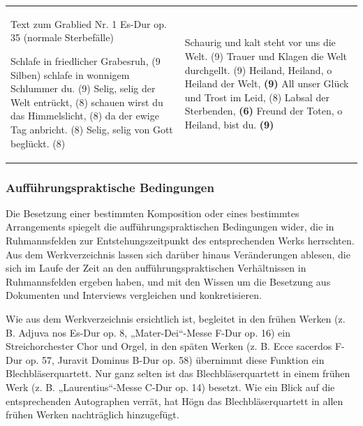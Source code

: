 \documentclass[a4paper]{article}
\begin{document}
\begin{flushleft}
\tablefirsthead{}
\tablehead{}
\tabletail{}
\tablelasttail{}
\begin{supertabular}{m{7.9230003cm}m{7.9230003cm}}
Text zum Grablied Nr. 1 Es-Dur op. 35 (normale Sterbefälle)

Schlafe in friedlicher Grabesruh, (9 Silben)\newline
schlafe in wonnigem Schlummer du. (9)\newline
Selig, selig der Welt entrückt, (8)\newline
schauen wirst du das Himmelslicht, (8)\newline
da der ewige Tag anbricht. (8)\newline
Selig, selig von Gott beglückt. (8) &
Schaurig und kalt steht vor uns die Welt. (9)\newline
Trauer und Klagen die Welt durchgellt. (9)\newline
Heiland, Heiland, o Heiland der Welt, \textbf{(9)}\newline
All unser Glück und Trost im Leid, (8)\newline
Labsal der Sterbenden, \textbf{(6)}\newline
Freund der Toten, o Heiland, bist du. \textbf{(9)}\\
\end{supertabular}
\end{flushleft}
\subsubsection{Aufführungspraktische Bedingungen}
\hypertarget{RefHeadingToc100333744}{}Die Besetzung einer bestimmten
Komposition oder eines bestimmtes Arrangements spiegelt die
aufführungspraktischen Bedingungen wider, die in Ruhmannsfelden zur
Entstehungszeitpunkt des entsprechenden Werks herrschten. Aus dem
Werkverzeichnis lassen sich darüber hinaus Veränderungen ablesen, die
sich im Laufe der Zeit an den aufführungspraktischen Verhältnissen in
Ruhmannsfelden ergeben haben, und mit den Wissen um die Besetzung aus
Dokumenten und Interviews vergleichen und konkretisieren.

Wie aus dem Werkverzeichnis ersichtlich ist, begleitet in den frühen
Werken (z. B. Adjuva nos Es-Dur op. 8, „Mater-Dei“-Messe F-Dur op. 16)
ein Streichorchester Chor und Orgel, in den späten Werken (z. B. Ecce
sacerdos F-Dur op. 57, Juravit Dominus B-Dur op. 58) übernimmt diese
Funktion ein Blechbläserquartett. Nur ganz selten ist das
Blechbläserquartett in einem frühen Werk (z. B. „Laurentius“-Messe
C-Dur op. 14) besetzt. Wie ein Blick auf die entsprechenden Autographen
verrät, hat Högn das Blechbläserquartett in allen frühen Werken
nachträglich hinzugefügt.
\end{document}
